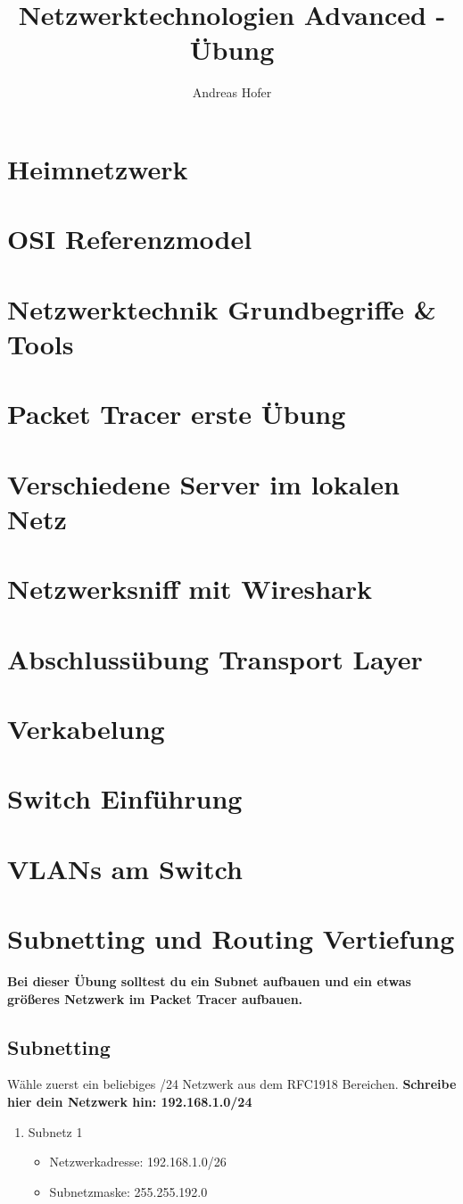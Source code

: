 \documentclass{article}
\title{\vspace{-1cm}Netzwerktechnologien Advanced - Übung}
\author{Andreas Hofer}
\begin{document}
	\maketitle
	\tableofcontents
	\section{Heimnetzwerk}
	\section{OSI Referenzmodel}
	\section{Netzwerktechnik Grundbegriffe \& Tools}
	\section{Packet Tracer erste Übung}
	\section{Verschiedene Server im lokalen Netz}
	\section{Netzwerksniff mit Wireshark}
	\section{Abschlussübung Transport Layer}
	\section{Verkabelung}
	\section{Switch Einführung}
	\section{VLANs am Switch}
	\section{Subnetting und Routing Vertiefung}
	\begin{center}
	\textbf{Bei dieser Übung solltest du ein Subnet aufbauen und ein etwas größeres Netzwerk im Packet Tracer aufbauen.}
	\subsection{Subnetting}
	Wähle zuerst ein beliebiges /24 Netzwerk aus dem RFC1918 Bereichen.
	\textbf{Schreibe hier dein Netzwerk hin: 192.168.1.0/24}
	\begin{enumerate}
		\item{Subnetz 1}
		\begin{itemize}
			\item[]{Netzwerkadresse: 192.168.1.0/26}
			\item[]{Subnetzmaske: 255.255.192.0}
		\end{itemize}
	\end{enumerate}
	\end{center}
\end{document}
